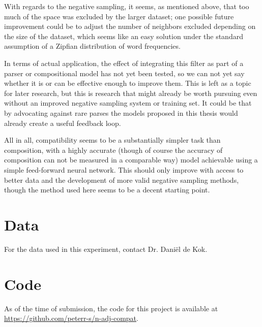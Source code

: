 \documentclass[a4paper, 12pt]{article}
\begin{document}
With regards to the negative sampling, it seems, as mentioned above, that too much of the space was excluded by the larger dataset; one possible future improvement could be to adjust the number of neighbors excluded depending on the size of the dataset, which seems like an easy solution under the standard assumption of a Zipfian distribution of word frequencies.

In terms of actual application, the effect of integrating this filter as part of a parser or compositional model has not yet been tested, so we can not yet say whether it is or can be effective enough to improve them. This is left as a topic for later research, but this is research that might already be worth pursuing even without an improved negative sampling system or training set. It could be that by advocating against rare parses the models proposed in this thesis would already create a useful feedback loop.

All in all, compatibility seems to be a substantially simpler task than composition, with a highly accurate (though of course the accuracy of composition can not be measured in a comparable way) model achievable using a simple feed-forward neural network. This should only improve with access to better data and the development of more valid negative sampling methods, though the method used here seems to be a decent starting point.


\clearpage
\printbibliography                      %

\clearpage
\appendix
\appendixpage                           %
\addappheadtotoc                        %

\section{Data}
For the data used in this experiment, contact Dr. Dani\"el de Kok.

\section{Code}
As of the time of submission, the code for this project is available at \url{https://github.com/peterr-s/n-adj-compat}.
\end{document}
